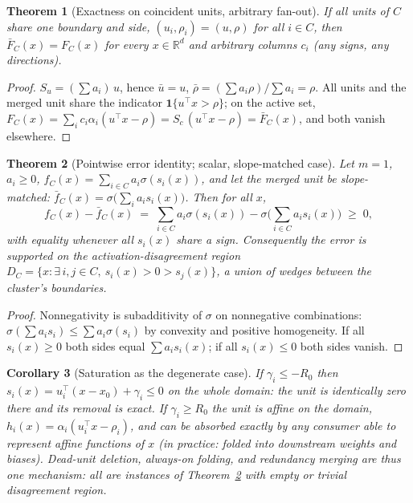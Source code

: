 \documentclass[11pt]{article}
\newtheorem{theorem}{Theorem}[section]
\newtheorem{corollary}[theorem]{Corollary}
\theoremstyle{remark}
\newcommand{\R}{\mathbb{R}}
\newcommand{\relu}{\sigma}
\begin{document}
\begin{theorem}[Exactness on coincident units, arbitrary fan-out]
\label{thm:exact}
If all units of $C$ share one boundary and side, $(u_i,\rho_i) = (u,\rho)$
for all $i\in C$, then $\bar F_C(x) = F_C(x)$ for \emph{every} $x\in\R^d$ and
\emph{arbitrary} columns $c_i$ (any signs, any directions).
\end{theorem}

\begin{proof}
$S_u = (\sum a_i)\,u$, hence $\bar u = u$, $\bar\rho =
(\sum a_i\rho)/\sum a_i = \rho$. All units and the merged unit share the
indicator $\mathbf{1}\{u^\top x > \rho\}$; on the active set,
$F_C(x) = \sum_i c_i\alpha_i (u^\top x - \rho) = S_c\,(u^\top x-\rho)
= \bar F_C(x)$, and both vanish elsewhere.
\end{proof}

\begin{theorem}[Pointwise error identity; scalar, slope-matched case]
\label{thm:identity}
Let $m = 1$, $a_i \ge 0$, $f_C(x) = \sum_{i\in C} a_i \relu(s_i(x))$, and let
the merged unit be slope-matched: $\bar f_C(x) = \relu\!\big(\sum_i a_i
s_i(x)\big)$. Then for all $x$,
\[
  f_C(x) - \bar f_C(x)
  \;=\; \sum_{i\in C} a_i \relu(s_i(x)) - \relu\!\Big(\sum_{i\in C} a_i
  s_i(x)\Big) \;\ge\; 0,
\]
with equality whenever all $s_i(x)$ share a sign. Consequently the error is
supported on the \emph{activation-disagreement region}
$D_C = \{x : \exists\, i,j \in C,\ s_i(x) > 0 > s_j(x)\}$, a union of wedges
between the cluster's boundaries.
\end{theorem}

\begin{proof}
Nonnegativity is subadditivity of $\relu$ on nonnegative combinations:
$\relu(\sum a_i s_i) \le \sum a_i \relu(s_i)$ by convexity and positive
homogeneity. If all $s_i(x) \ge 0$ both sides equal $\sum a_i s_i(x)$; if
all $s_i(x)\le 0$ both sides vanish.
\end{proof}

\begin{corollary}[Saturation as the degenerate case]\label{cor:saturation}
If $\gamma_i \le -R_0$ then $s_i(x) = u_i^\top(x-x_0) + \gamma_i \le 0$ on the
whole domain: the unit is identically zero there and its removal is exact.
If $\gamma_i \ge R_0$ the unit is \emph{affine} on the domain,
$h_i(x) = \alpha_i(u_i^\top x - \rho_i)$, and can be absorbed exactly by any
consumer able to represent affine functions of $x$ (in practice: folded into
downstream weights and biases). Dead-unit deletion, always-on folding, and
redundancy merging are thus one mechanism: all are instances of
Theorem~\ref{thm:identity} with empty or trivial disagreement region.
\end{corollary}
\end{document}
